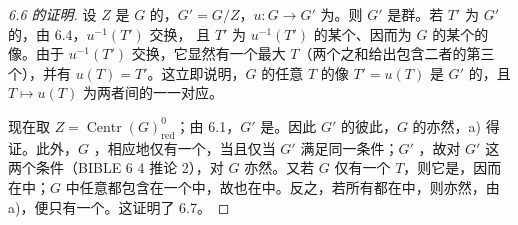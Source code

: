 \begin{proof}[6.6 的证明]
设 $Z$ 是 $G$ 的，$G'=G/Z$，$u:G\to G'$ 为。则 $G'$ 是群。若 $T'$ 为 $G'$ 的，由 6.4，$u^{-1}(T')$ 交换，
且 $T'$ 为 $u^{-1}(T')$ 的某个、因而为 $G$ 的某个的像。由于 $u^{-1}(T')$ 交换，它显然有一个最大 $T$（两个之和给出包含二者的第三个），并有 $u(T)=T'$。这立即说明，$G$ 的任意 $T$ 的像 $T'=u(T)$ 是 $G'$ 的，且 $T\mapsto u(T)$ 为两者间的一一对应。

现在取 $Z=\operatorname{Centr}(G)^0_{\mathrm{red}}$；由 6.1，$G'$ 是。因此 $G'$ 的彼此，$G$ 的亦然，a) 得证。此外，$G$ ，相应地仅有一个，当且仅当 $G'$ 满足同一条件；$G'$ ，故对 $G'$ 这两个条件（BIBLE 6  4 推论 2），对 $G$ 亦然。又若 $G$ 仅有一个 $T$，则它是，因而在中；$G$ 中任意都包含在一个中，故也在中。反之，若所有都在中，则亦然，由 a)，便只有一个。这证明了 6.7。


\end{proof}
